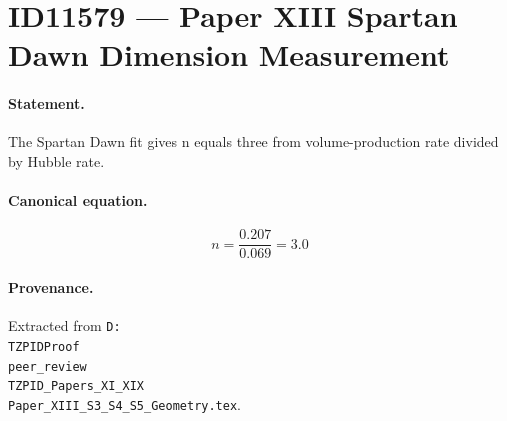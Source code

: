 \section*{ID11579 --- Paper XIII Spartan Dawn Dimension Measurement}

\paragraph{Statement.}
The Spartan Dawn fit gives n equals three from volume-production rate divided by Hubble rate.

\paragraph{Canonical equation.}
\[
n=\frac{0.207}{0.069}=3.0
\]

\paragraph{Provenance.}
Extracted from \texttt{D:\\TZPIDProof\\peer\_review\\TZPID\_Papers\_XI\_XIX\\Paper\_XIII\_S3\_S4\_S5\_Geometry.tex}.
